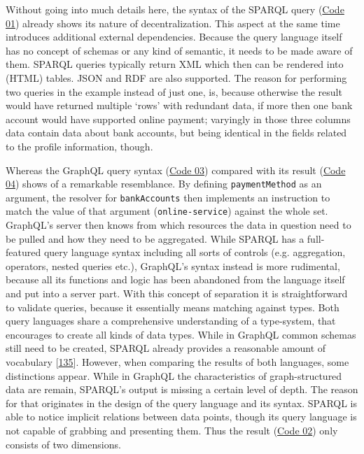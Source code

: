 \documentclass[12pt,english,a4paper,titlepage,cleardoublepage=empty,dottedtoc]{report}
\begin{document}
Without going into much details here, the syntax of the SPARQL query
(\protect\hyperlink{code-01_sparql-query}{Code 01}) already shows its
nature of decentralization. This aspect at the same time introduces
additional external dependencies. Because the query language itself has
no concept of schemas or any kind of semantic, it needs to be made aware
of them. SPARQL queries typically return XML which then can be rendered
into (HTML) tables. JSON and RDF are also supported. The reason for
performing two queries in the example instead of just one, is, because
otherwise the result would have returned multiple `rows' with redundant
data, if more then one bank account would have supported online payment;
varyingly in those three columns data contain data about bank accounts,
but being identical in the fields related to the profile information,
though.

Whereas the GraphQL query syntax
(\protect\hyperlink{code-03_graphql-query}{Code 03}) compared with its
result (\protect\hyperlink{code-04_graphql-query-result}{Code 04}) shows
of a remarkable resemblance. By defining \texttt{paymentMethod} as an
argument, the resolver for \texttt{bankAccounts} then implements an
instruction to match the value of that argument
(\texttt{\textquotesingle{}online-service\textquotesingle{}}) against
the whole set. GraphQL's server then knows from which resources the data
in question need to be pulled and how they need to be aggregated. While
SPARQL has a full-featured query language syntax including all sorts of
controls (e.g. aggregation, operators, nested queries etc.), GraphQL's
syntax instead is more rudimental, because all its functions and logic
has been abandoned from the language itself and put into a server part.
With this concept of separation it is straightforward to validate
queries, because it essentially means matching against types. Both query
languages share a comprehensive understanding of a type-system, that
encourages to create all kinds of data types. While in GraphQL common
schemas still need to be created, SPARQL already provides a reasonable
amount of vocabulary
{[}\protect\hyperlink{ref-web_w3c-tr_rdf-schemas}{135}{]}. However, when
comparing the results of both languages, some distinctions appear. While
in GraphQL the characteristics of graph-structured data are remain,
SPARQL's output is missing a certain level of depth. The reason for that
originates in the design of the query language and its syntax. SPARQL is
able to notice implicit relations between data points, though its query
language is not capable of grabbing and presenting them. Thus the result
(\protect\hyperlink{code-02_sparql-query-results}{Code 02}) only
consists of two dimensions.
\end{document}
